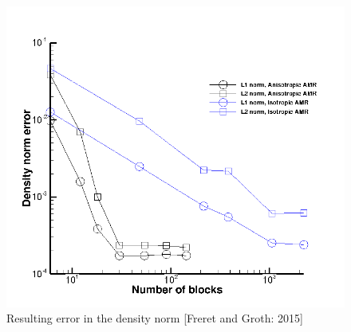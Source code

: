 \begin{figure}
    \vspace{0.2cm}
    \begin{center}
      \includegraphics[height=0.45\textwidth]{./figs/outflowError.png}
    \end{center}
    \caption{Resulting error in the density norm [Freret and Groth: 2015] \cite{Freret:2015}}  
    \vspace{0.2cm}
    \label{fig:outErr}
\end{figure}
